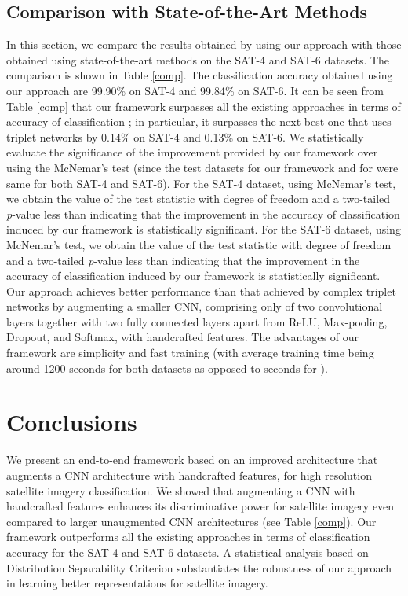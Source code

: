 \documentclass[]{interact}
\theoremstyle{plain}\newtheorem{theorem}{Theorem}[section]
\theoremstyle{definition}
\theoremstyle{remark}
\begin{document}
\subsection{Comparison with State-of-the-Art Methods}
In this section, we compare the results obtained by using our  approach  with those obtained using   state-of-the-art methods  on  the SAT-4 and SAT-6 datasets. The comparison is  shown in Table \ref{comp}. The classification accuracy obtained using  our approach are 99.90\% on SAT-4 and 99.84\% on SAT-6.   
It can be seen from Table \ref{comp} that  our framework surpasses all the existing approaches in terms of accuracy of classification  \citep{basu2015,simo2015discriminative,zhong2017satcnn,ma2016satellite,gong2018diversity, liu2018scene}; in particular, it surpasses  the next best one \citep{liu2018scene}  that uses triplet networks by 0.14\% on SAT-4 and 0.13\% on SAT-6. We statistically evaluate the significance of the improvement provided by our framework over \citep{liu2018scene} using the McNemar's test (since the test datasets for  our framework and for \citep{liu2018scene} were same for both SAT-4 and SAT-6). For the SAT-4 dataset, using McNemar's test, we obtain  the value of the test statistic  with degree of freedom  and a two-tailed \textit{p}-value less than  indicating that the improvement in the accuracy of classification induced by our framework is statistically significant.  For the SAT-6 dataset, using McNemar's test, we obtain  the value of the test statistic  with degree of freedom  and a two-tailed \textit{p}-value less than  indicating that the improvement in the accuracy of classification induced by our framework is statistically significant. Our approach achieves better performance than that achieved by  complex triplet networks \citep{liu2018scene}  by augmenting  a smaller  CNN,  comprising  only  of  two convolutional layers together with  two fully connected  layers apart from  ReLU, Max-pooling, Dropout, and Softmax, with handcrafted features. The advantages of our framework are simplicity and fast training (with average training time being around 1200 seconds for both datasets as opposed to  seconds for \citep{zhong2017satcnn}). 

\section{Conclusions}
We present an end-to-end framework based on an improved architecture that  augments a  CNN architecture with handcrafted features, for high resolution satellite imagery classification. We showed that augmenting a CNN with  handcrafted features  enhances its discriminative power  for satellite imagery even compared to larger unaugmented CNN architectures \citep{zhong2017satcnn} (see Table \ref{comp}). Our framework outperforms all the existing approaches \citep{basu2015,simo2015discriminative,zhong2017satcnn,ma2016satellite,gong2018diversity, liu2018scene} in terms of classification accuracy for the SAT-4 and SAT-6 datasets. A statistical analysis based on Distribution Separability Criterion  substantiates the robustness of our approach in learning better representations for satellite imagery. 







\end{document}
